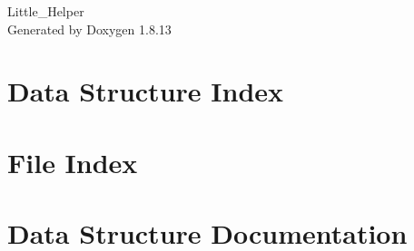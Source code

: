 \documentclass[twoside]{book}
\newcommand{\+}{\discretionary{\mbox{\scriptsize$\hookleftarrow$}}{}{}}
\newcommand{\clearemptydoublepage}{%
  \newpage{\pagestyle{empty}\cleardoublepage}%
}
\begin{document}
\hypersetup{pageanchor=false,
             bookmarksnumbered=true,
             pdfencoding=unicode
            }
\begin{titlepage}
\vspace*{7cm}
\begin{center}%
{\Large Little\+\_\+\+Helper }\\
\vspace*{1cm}
{\large Generated by Doxygen 1.8.13}\\
\end{center}
\end{titlepage}
\clearemptydoublepage
{}
\tableofcontents
\clearemptydoublepage
{}
\hypersetup{pageanchor=true}

\chapter{Data Structure Index}

\chapter{File Index}

\chapter{Data Structure Documentation}












\end{document}
